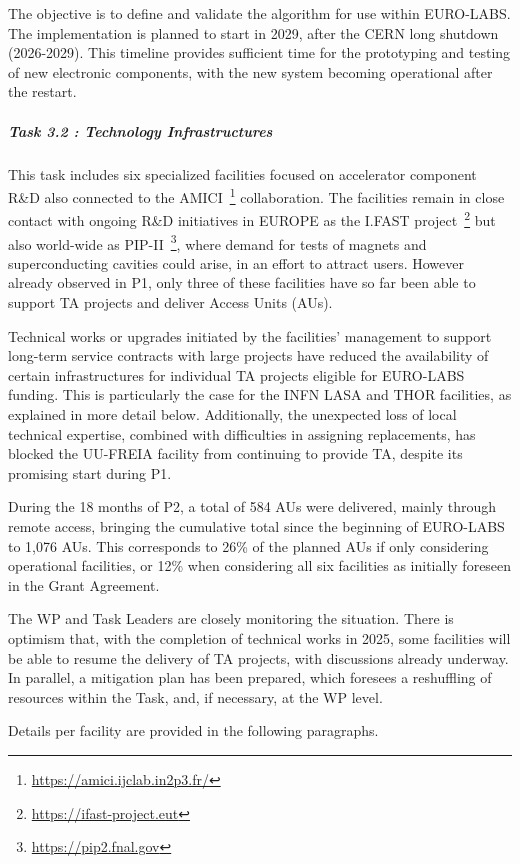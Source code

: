 The objective is to define and validate the algorithm for use within EURO-LABS. The implementation is planned to start in 2029, after the CERN long shutdown (2026-2029). This timeline provides sufficient time for the prototyping and testing of new electronic components, with the new system becoming operational after the restart.

\subparagraph{Task 3.2 : Technology Infrastructures} \mbox{}

This task includes six specialized facilities focused on accelerator component R\&D also connected to the AMICI~\footnote{\url{https://amici.ijclab.in2p3.fr/}} collaboration. The facilities remain in close contact with ongoing R\&D initiatives in EUROPE as the I.FAST project~\footnote{\url{https://ifast-project.eut}} but also world-wide as PIP-II~\footnote{\url{https://pip2.fnal.gov}}, where demand for tests of magnets and superconducting cavities could arise, in an effort to attract users. However already observed in P1, only three of these facilities have so far been able to support TA projects and deliver Access Units (AUs).

Technical works or upgrades initiated by the facilities' management to support long-term service contracts with large projects have reduced the availability of certain infrastructures for individual TA projects eligible for EURO-LABS funding. This is particularly the case for the INFN LASA and THOR facilities, as explained in more detail below. Additionally, the unexpected loss of local technical expertise, combined with difficulties in assigning replacements, has blocked the UU-FREIA facility from continuing to provide TA, despite its promising start during P1.

During the 18 months of P2, a total of 584 AUs were delivered, mainly through remote access, bringing the cumulative total since the beginning of EURO-LABS to 1,076 AUs. This corresponds to 26\% of the planned AUs if only considering operational facilities, or 12\% when considering all six facilities as initially foreseen in the Grant Agreement.

The WP and Task Leaders are closely monitoring the situation. There is optimism that, with the completion of technical works in 2025, some facilities will be able to resume the delivery of TA projects, with discussions already underway. In parallel, a mitigation plan has been prepared, which foresees a reshuffling of resources within the Task, and, if necessary, at the WP level.

Details per facility are provided in the following paragraphs.

